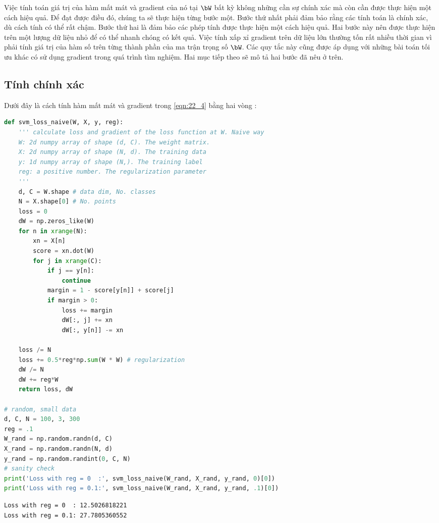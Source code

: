 Việc tính toán giá trị của hàm mất mát và gradient của nó tại $\bW$ bất kỳ không
những cần sự chính xác mà còn cần được thực hiện một cách hiệu quả. Để đạt được
điều đó, chúng ta sẽ thực hiện từng bước một. Bước thứ nhất phải đảm bảo rằng các
tính toán là {chính xác}, dù cách tính có thể rất chậm. Bước thứ hai là đảm bảo
các phép tính được thực hiện một cách hiệu quả. Hai bước này nên được thực hiện
trên một lượng dữ liệu nhỏ để có thể nhanh chóng có kết quả. Việc tính xấp xỉ
gradient trên dữ liệu lớn thường tốn rất nhiều thời gian vì phải tính giá trị
của hàm số trên từng thành phần của ma trận trọng số $\bW$. Các quy tắc này cũng
được áp dụng với những bài toán tối ưu khác có sử dụng gradient trong quá trình
tìm nghiệm. Hai mục tiếp theo sẽ mô tả hai bước đã nêu ở trên.
 
 
\subsection{Tính chính xác}
 
 
Dưới đây là cách tính hàm mất mát và gradient trong \eqref{eqn:22_4}
bằng hai vòng :
\begin{lstlisting}[language=Python]
def svm_loss_naive(W, X, y, reg):
    ''' calculate loss and gradient of the loss function at W. Naive way 
    W: 2d numpy array of shape (d, C). The weight matrix.
    X: 2d numpy array of shape (N, d). The training data 
    y: 1d numpy array of shape (N,). The training label
    reg: a positive number. The regularization parameter
    '''
    d, C = W.shape # data dim, No. classes
    N = X.shape[0] # No. points
    loss = 0 
    dW = np.zeros_like(W)
    for n in xrange(N):
        xn = X[n]
        score = xn.dot(W)
        for j in xrange(C):
            if j == y[n]:
                continue 
            margin = 1 - score[y[n]] + score[j]
            if margin > 0:
                loss += margin 
                dW[:, j] += xn 
                dW[:, y[n]] -= xn
    
    loss /= N 
    loss += 0.5*reg*np.sum(W * W) # regularization
    dW /= N 
    dW += reg*W
    return loss, dW  

# random, small data
d, C, N = 100, 3, 300
reg = .1 
W_rand = np.random.randn(d, C)
X_rand = np.random.randn(N, d)
y_rand = np.random.randint(0, C, N)
# sanity check
print('Loss with reg = 0  :', svm_loss_naive(W_rand, X_rand, y_rand, 0)[0])
print('Loss with reg = 0.1:', svm_loss_naive(W_rand, X_rand, y_rand, .1)[0])
\end{lstlisting}
\kq 
\begin{lstlisting}
Loss with reg = 0  : 12.5026818221
Loss with reg = 0.1: 27.7805360552
\end{lstlisting}
 

